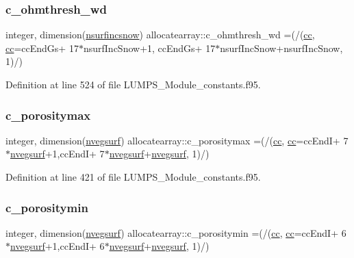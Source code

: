 \subsubsection{\texorpdfstring{c\+\_\+ohmthresh\+\_\+wd}{c\_ohmthresh\_wd}}
{\footnotesize\ttfamily integer, dimension(\hyperlink{namespaceallocatearray_af4d113f332b6759cfa22271140c9162d}{nsurfincsnow}) allocatearray\+::c\+\_\+ohmthresh\+\_\+wd =(/(\hyperlink{namespaceallocatearray_ac863c81704eb507dee10f5e10741e10c}{cc}, \hyperlink{namespaceallocatearray_ac863c81704eb507dee10f5e10741e10c}{cc}=cc\+End\+Gs+ 17$\ast$nsurf\+Inc\+Snow+1, cc\+End\+Gs+ 17$\ast$nsurf\+Inc\+Snow+nsurf\+Inc\+Snow, 1)/)}



Definition at line 524 of file L\+U\+M\+P\+S\+\_\+\+Module\+\_\+constants.\+f95.

\mbox{\label{namespaceallocatearray_acd03bda7378d9fdd4799f1e67d4ea05c}} 
\subsubsection{\texorpdfstring{c\+\_\+porositymax}{c\_porositymax}}
{\footnotesize\ttfamily integer, dimension(\hyperlink{namespaceallocatearray_abb987c3b35dd321963fd53d38f10236f}{nvegsurf}) allocatearray\+::c\+\_\+porositymax =(/(\hyperlink{namespaceallocatearray_ac863c81704eb507dee10f5e10741e10c}{cc}, \hyperlink{namespaceallocatearray_ac863c81704eb507dee10f5e10741e10c}{cc}=cc\+EndI+ 7$\ast$\hyperlink{namespaceallocatearray_abb987c3b35dd321963fd53d38f10236f}{nvegsurf}+1,cc\+EndI+ 7$\ast$\hyperlink{namespaceallocatearray_abb987c3b35dd321963fd53d38f10236f}{nvegsurf}+\hyperlink{namespaceallocatearray_abb987c3b35dd321963fd53d38f10236f}{nvegsurf}, 1)/)}



Definition at line 421 of file L\+U\+M\+P\+S\+\_\+\+Module\+\_\+constants.\+f95.

\mbox{\label{namespaceallocatearray_ad1692d16ac9e6c1a290140e7e6472a33}} 
\subsubsection{\texorpdfstring{c\+\_\+porositymin}{c\_porositymin}}
{\footnotesize\ttfamily integer, dimension(\hyperlink{namespaceallocatearray_abb987c3b35dd321963fd53d38f10236f}{nvegsurf}) allocatearray\+::c\+\_\+porositymin =(/(\hyperlink{namespaceallocatearray_ac863c81704eb507dee10f5e10741e10c}{cc}, \hyperlink{namespaceallocatearray_ac863c81704eb507dee10f5e10741e10c}{cc}=cc\+EndI+ 6$\ast$\hyperlink{namespaceallocatearray_abb987c3b35dd321963fd53d38f10236f}{nvegsurf}+1,cc\+EndI+ 6$\ast$\hyperlink{namespaceallocatearray_abb987c3b35dd321963fd53d38f10236f}{nvegsurf}+\hyperlink{namespaceallocatearray_abb987c3b35dd321963fd53d38f10236f}{nvegsurf}, 1)/)}



